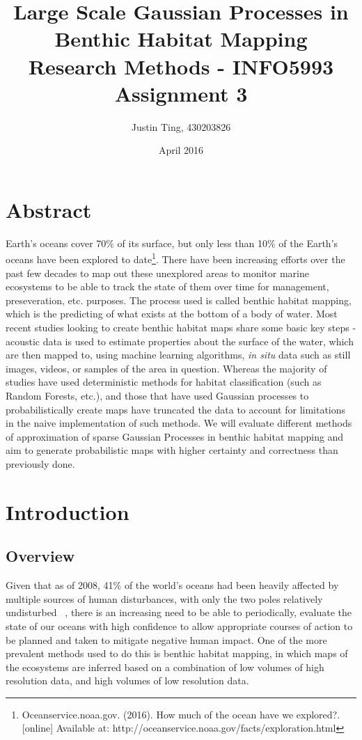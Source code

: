 \documentclass[10pt,sts]{article}
\title{Large Scale Gaussian Processes in Benthic Habitat Mapping \\ Research Methods - INFO5993 Assignment 3}
\author{Justin Ting, 430203826}
\date{April 2016}
\begin{document}
\maketitle

\begin{multicols}{2}

    \section{Abstract}

    Earth's oceans cover 70\% of its surface, but only less than 10\% of the Earth's oceans have been explored to date\footnote{Oceanservice.noaa.gov. (2016). How much of the ocean have we explored?. [online] Available at: http://oceanservice.noaa.gov/facts/exploration.html}. There have been increasing efforts over the past few decades to map out these unexplored areas to monitor marine ecosystems to be able to track the state of them over time for management, preseveration, etc. purposes. The process used is called benthic habitat mapping, which is the predicting of what exists at the bottom of a body of water. Most recent studies looking to create benthic habitat maps share some basic key steps - acoustic data is used to estimate properties about the surface of the water, which are then mapped to, using machine learning algorithms, \textit{in situ} data such as still images, videos, or samples of the area in question. Whereas the majority of studies have used deterministic methods for habitat classification (such as Random Forests, etc.), and those that have used Gaussian processes to probabilistically create maps have truncated the data to account for limitations in the naive implementation of such methods. We will evaluate different methods of approximation of sparse Gaussian Processes in benthic habitat mapping and aim to generate probabilistic maps with higher certainty and correctness than previously done.

    \section{Introduction}

    \subsection{Overview}
    
    Given that as of 2008, 41\% of the world's oceans had been heavily affected by multiple sources of human disturbances, with only the two poles relatively undisturbed ~\citep{halpern08}, there is an increasing need to be able to periodically, evaluate the state of our oceans with high confidence to allow appropriate courses of action to be planned and taken to mitigate negative human impact. One of the more prevalent methods used to do this is benthic habitat mapping, in which maps of the ecosystems are inferred based on a combination of low volumes of high resolution data, and high volumes of low resolution data. 
    

\end{multicols}
\end{document}
